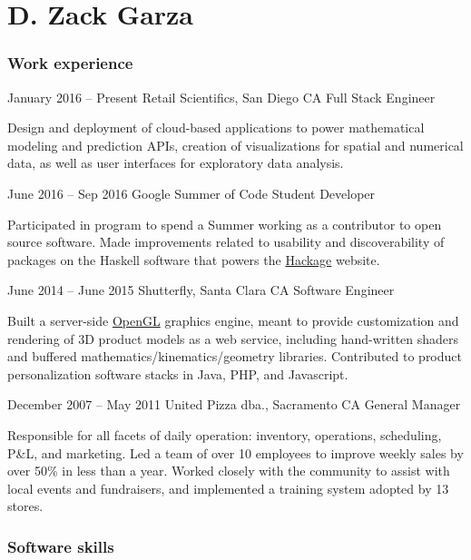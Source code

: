 \documentclass{tccv}
\begin{document}
\part{D. Zack Garza}

\section{Work experience}

\begin{eventlist}

\item{January 2016 -- Present}
     {Retail Scientifics, San Diego CA}
     {Full Stack Engineer}
     
     Design and deployment of cloud-based applications to power mathematical modeling and prediction APIs, creation of visualizations for spatial and numerical data, as well as user interfaces for exploratory data analysis.
     
\item{June 2016 -- Sep 2016}
     {Google Summer of Code}
     {Student Developer}
     
     Participated in program to spend a Summer working as a contributor to open source software. Made improvements related to usability and discoverability of packages on the Haskell software that powers the \href{https://hackage.haskell.org/}{Hackage} website.

\item{June 2014 -- June 2015}
     {Shutterfly, Santa Clara CA}
     {Software Engineer}

    Built a server-side \href{https://www.opengl.org/}{OpenGL} graphics engine, meant to provide customization and rendering of 3D product models as a web service, including hand-written shaders and buffered mathematics/kinematics/geometry libraries. Contributed to product personalization software stacks in Java, PHP, and Javascript.

\item{December 2007 -- May 2011}
     {United Pizza dba., Sacramento CA}
     {General Manager}

    Responsible for all facets of daily operation: inventory, operations, scheduling, P\&L, and marketing. Led a team of over 10 employees to improve weekly sales by over 50\% in less than a year. Worked closely with the community to assist with local events and fundraisers, and implemented a training system adopted by 13 stores.

\section{Software skills}


\end{eventlist}
\end{document}
